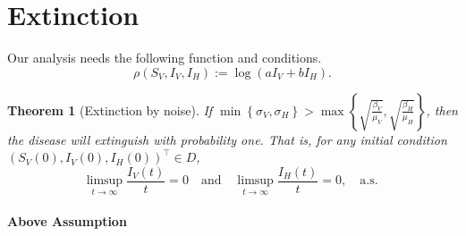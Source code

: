 \documentclass{amsart}
\theoremstyle{plain}
\newtheorem{theorem}{Theorem}
\theoremstyle{definition}
\begin{document}
    \section{Extinction}
        Our analysis needs the following function and conditions.
        \begin{equation}
            \rho (S_V, I_V, I_H) := \log (a I_V + b I_H) .
        \end{equation}
%
%
%
%
%
        \begin{theorem}[Extinction by noise]
                If 
                $
                    \displaystyle
                    \min
                        \left \{
                              \sigma_V, \sigma_H 
                        \right\} 
                        > 
                    \max 
                        \left \{
                            \sqrt{\frac{\beta_V}{\mu_V}},
                            \sqrt{\frac{\beta_H}{\mu_H}}
                        \right \}
                $,
                then the disease will extinguish with probability one.  That is,
                for any initial condition $(S_V(0), I_V(0), I_H(0)) ^{\top} \in 
                D$,
                $$
                    \limsup_{t \to \infty} 
                        \frac{I_V(t)}{t} = 0 
                        \quad \text{and} \quad
                    \limsup_{t \to \infty} 
                        \frac{I_H(t)}{t} = 0, \quad 
                        \text{
                           a.s.
                        }
                $$
        \end{theorem}        
%
%
%
%
    \paragraph{Above Assumption}
\end{document}
